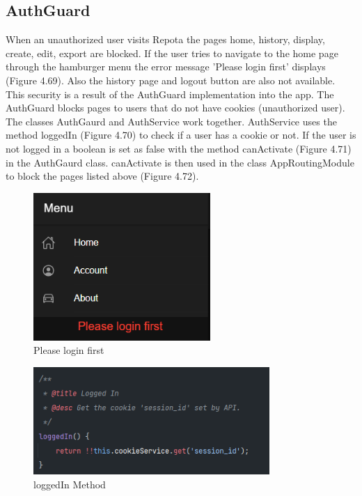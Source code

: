 \subsection{AuthGuard}
When an unauthorized user visits Repota the pages home, history, display, create, edit, export are blocked. If the user tries to navigate to the home page through the hamburger menu the error message 'Please login first' displays (Figure 4.69). Also the history page and logout button are also not available. This security is a result of the AuthGuard implementation into the app. The AuthGuard blocks pages to users that do not have cookies (unauthorized user). The classes AuthGaurd and AuthService work together. AuthService uses the method loggedIn (Figure 4.70) to check if a user has a cookie or not. If the user is not logged in a boolean is set as false with the method canActivate (Figure 4.71) in the AuthGaurd class. canActivate is then used in the class AppRoutingModule to block the pages listed above (Figure 4.72).

\begin{figure}[H]
    \centering
    \caption{Please login first}
    \label{image:pleaseLogin}
    \includegraphics[width=0.6\textwidth]{images/repota/UI/please_login.png}
\end{figure}

\begin{figure}[H]
    \centering
    \caption{loggedIn Method}
    \label{image:loggedIn}
    \includegraphics[width=0.8\textwidth]{images/repota/auth_guard/loggedIn.png}
\end{figure}

